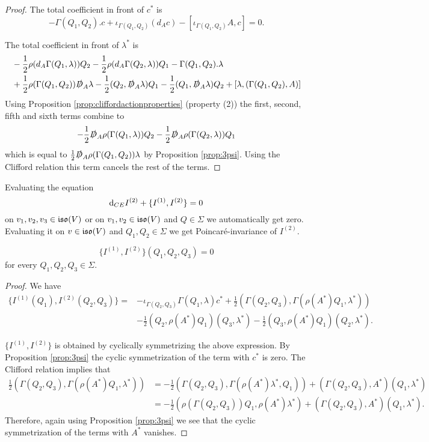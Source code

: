 \documentclass[10pt, oneside]{article}
\begin{document}
\begin{proof}
The total coefficient in front of $c^*$ is
\[-\Gamma(Q_1, Q_2).c + \iota_{\Gamma(Q_1, Q_2)}(d_A c) - [\iota_{\Gamma(Q_1, Q_2)} A, c] = 0.\]

The total coefficient in front of $\lambda^*$ is
\begin{align*}
&-\frac{1}{2}\rho(d_A \Gamma(Q_1, \lambda))Q_2 -\frac{1}{2}\rho(d_A \Gamma(Q_2, \lambda))Q_1 - \Gamma(Q_1, Q_2).\lambda \\
&+ \frac{1}{2}\rho(\Gamma(Q_1, Q_2))\slashed{D}_A\lambda - \frac{1}{2}(Q_2, \slashed{D}_A\lambda) Q_1 -\frac{1}{2}(Q_1, \slashed{D}_A\lambda) Q_2 + [\lambda, (\Gamma(Q_1, Q_2), A)]
\end{align*}
Using Proposition \ref{prop:cliffordactionproperties} (property (2)) the first, second, fifth and sixth terms combine to
\[-\frac{1}{2} \slashed{D}_A\rho(\Gamma(Q_1, \lambda))Q_2 - \frac{1}{2} \slashed{D}_A\rho(\Gamma(Q_2, \lambda)) Q_1\]
which is equal to $\frac{1}{2} \slashed{D}_A \rho(\Gamma(Q_1, Q_2))\lambda$ by Proposition \ref{prop:3psi}. Using the Clifford relation this term cancels the rest of the terms.
\end{proof}

Evaluating the equation
\[{\rm d}_{CE} I^{(2)} + \{I^{(1)}, I^{(2)}\} = 0\]
on $v_1, v_2, v_3\in\mathfrak{iso}(V)$ or on $v_1, v_2\in\mathfrak{iso}(V)$ and $Q\in\Sigma$ we automatically get zero. Evaluating it on $v\in\mathfrak{iso}(V)$ and $Q_1, Q_2\in\Sigma$ we get Poincar\'{e}-invariance of $I^{(2)}$.

\begin{lemma}
\[\{I^{(1)}, I^{(2)}\}(Q_1, Q_2, Q_3) = 0\]
for every $Q_1, Q_2, Q_3\in\Sigma$.
\end{lemma}
\begin{proof}
We have
\begin{align*}
\{I^{(1)}(Q_1), I^{(2)}(Q_2, Q_3)\} = &-\iota_{\Gamma(Q_2, Q_3)}\Gamma(Q_1, \lambda) c^* + \frac{1}{2} (\Gamma(Q_2, Q_3), \Gamma(\rho(A^*) Q_1, \lambda^*)) \\
&- \frac{1}{2}(Q_2, \rho(A^*)Q_1)(Q_3, \lambda^*) - \frac{1}{2}(Q_3, \rho(A^*) Q_1)(Q_2, \lambda^*).
\end{align*}

$\{I^{(1)}, I^{(2)}\}$ is obtained by cyclically symmetrizing the above expression. By Proposition \ref{prop:3psi} the cyclic symmetrization of the term with $c^*$ is zero. The Clifford relation implies that
\begin{align*}
\frac{1}{2} (\Gamma(Q_2, Q_3), \Gamma(\rho(A^*) Q_1, \lambda^*)) &= -\frac{1}{2}(\Gamma(Q_2, Q_3), \Gamma(\rho(A^*)\lambda^*, Q_1)) + (\Gamma(Q_2, Q_3), A^*) (Q_1, \lambda^*) \\
&= -\frac{1}{2}(\rho(\Gamma(Q_2, Q_3)) Q_1, \rho(A^*)\lambda^*) + (\Gamma(Q_2, Q_3), A^*) (Q_1, \lambda^*).
\end{align*}
Therefore, again using Proposition \ref{prop:3psi} we see that the cyclic symmetrization of the terms with $A^*$ vanishes.
\end{proof}
\end{document}
